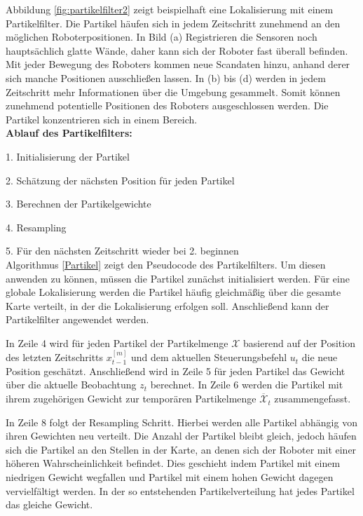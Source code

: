 Abbildung \ref{fig:partikelfilter2} zeigt beispielhaft eine Lokalisierung mit einem Partikelfilter. Die Partikel häufen sich in jedem Zeitschritt zunehmend an den möglichen Roboterpositionen. In Bild (a) Registrieren die Sensoren noch hauptsächlich glatte Wände, daher kann sich der Roboter fast überall befinden. Mit jeder Bewegung des Roboters kommen neue Scandaten hinzu, anhand derer sich manche Positionen ausschließen lassen. In (b) bis (d) werden in jedem Zeitschritt mehr Informationen über die Umgebung gesammelt. Somit können zunehmend potentielle Positionen des Roboters ausgeschlossen werden. Die Partikel konzentrieren sich in einem Bereich. \\

\textbf{Ablauf des Partikelfilters:}

1. Initialisierung der Partikel

2. Schätzung der nächsten Position für jeden Partikel

3. Berechnen der Partikelgewichte

4. Resampling

5. Für den nächsten Zeitschritt wieder bei 2. beginnen \\

Algorithmus \ref{Partikel} zeigt den Pseudocode des Partikelfilters. Um diesen anwenden zu können, müssen die Partikel zunächst initialisiert werden. Für eine globale Lokalisierung werden die Partikel häufig gleichmäßig über die gesamte Karte verteilt, in der die Lokalisierung erfolgen soll. Anschließend kann der Partikelfilter angewendet werden. 

In Zeile 4 wird für jeden Partikel der Partikelmenge  $ \mathcal{X} $ basierend auf der Position des letzten Zeitschritts $ x_{t-1}^{[m]} $ und dem aktuellen Steuerungsbefehl $ u_t $ die neue Position geschätzt. Anschließend wird in Zeile 5 für jeden Partikel das Gewicht über die aktuelle Beobachtung $ z_t $ berechnet. In Zeile 6 werden die Partikel mit ihrem zugehörigen Gewicht zur temporären Partikelmenge $ \overline{\mathcal{X}}_t $ zusammengefasst. 

In Zeile 8 folgt der Resampling Schritt. Hierbei werden alle Partikel abhängig von ihren Gewichten neu verteilt. Die Anzahl der Partikel bleibt gleich, jedoch häufen sich die Partikel an den Stellen in der Karte, an denen sich der Roboter mit einer höheren Wahrscheinlichkeit befindet. Dies geschieht indem Partikel mit einem niedrigen Gewicht wegfallen und Partikel mit einem hohen Gewicht dagegen vervielfältigt werden. In der so entstehenden Partikelverteilung hat jedes Partikel das gleiche Gewicht.  

